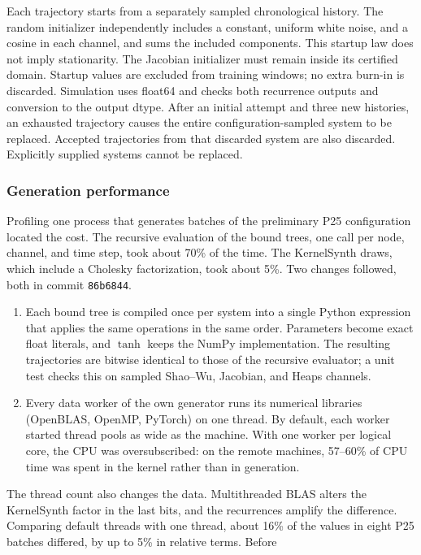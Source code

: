 Each trajectory starts from a separately sampled chronological history. The
random initializer independently includes a constant, uniform white noise, and
a cosine in each channel, and sums the included components. This startup law
does not imply stationarity. The Jacobian initializer must remain inside its
certified domain. Startup values are excluded from training windows; no extra
burn-in is discarded. Simulation uses float64 and checks both recurrence outputs
and conversion to the output dtype. After an initial attempt and three new
histories, an exhausted trajectory causes the entire configuration-sampled
system to be replaced. Accepted trajectories from that discarded system are
also discarded. Explicitly supplied systems cannot be replaced.

\subsubsection{Generation performance}
\label{sec:multivariate-generation-performance}
Profiling one process that generates batches of the preliminary P25
configuration located the cost. The recursive evaluation of the bound trees,
one call per node, channel, and time step, took about 70\% of the time. The
KernelSynth draws, which include a Cholesky factorization, took about 5\%.
Two changes followed, both in commit \texttt{86b6844}.
\begin{enumerate}
\item Each bound tree is compiled once per system into a single Python
 expression that applies the same operations in the same order. Parameters
 become exact float literals, and $\tanh$ keeps the NumPy implementation.
 The resulting trajectories are bitwise identical to those of the recursive
 evaluator; a unit test checks this on sampled Shao--Wu, Jacobian, and Heaps
 channels.
\item Every data worker of the own generator runs its numerical libraries
 (OpenBLAS, OpenMP, PyTorch) on one thread. By default, each worker started
 thread pools as wide as the machine. With one worker per logical core, the
 CPU was oversubscribed: on the remote machines, 57--60\% of CPU time was
 spent in the kernel rather than in generation.
\end{enumerate}
The thread count also changes the data. Multithreaded BLAS alters the
KernelSynth factor in the last bits, and the recurrences amplify the
difference. Comparing default threads with one thread, about 16\% of the
values in eight P25 batches differed, by up to 5\% in relative terms. Before
